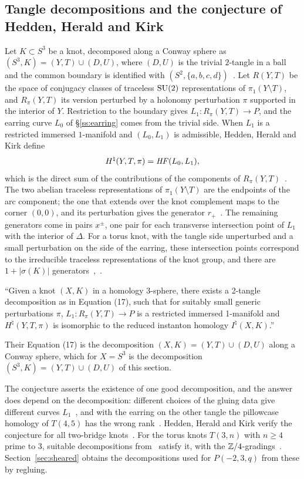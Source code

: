 \subsection{Tangle decompositions and the conjecture of Hedden, Herald and Kirk}\label{ss:decomp}
Let $K\subset S^3$ be a knot, decomposed along a Conway sphere as $(S^3,K)=(Y,T)\cup(D,U)$, where $(D,U)$ is the
trivial $2$-tangle in a ball and the common boundary is identified with
$(S^2,\{a,b,c,d\})$~\cite[(17)]{HHK2}. Let $R(Y,T)$ be the space of conjugacy classes of traceless $\mathrm{SU}(2)$
representations of $\pi_1(Y\setminus T)$, and $R_\pi(Y,T)$ its version perturbed by a holonomy perturbation $\pi$
supported in the interior of $Y$. Restriction to the boundary gives $L_1\colon R_\pi(Y,T)\to P$, and the earring
curve $L_0$ of \S\ref{ss:earring} comes from the trivial side. When $L_1$ is a restricted immersed $1$-manifold and
$(L_0,L_1)$ is admissible, Hedden, Herald and Kirk define
\[
H^{\natural}(Y,T,\pi)=\mathit{HF}(L_0,L_1),
\]
which is the direct sum of the contributions of the components of
$R_\pi(Y,T)$~\cite[p.~34, \S6.1]{HHK2}. The two abelian traceless representations of $\pi_1(Y\setminus T)$ are the
endpoints of the arc component; the one that extends over the knot complement maps to the corner $(0,0)$, and its
perturbation gives the generator $r_+$~\cite[\S6.1, \S8]{HHK2}. The remaining generators come in pairs $x^\pm$, one
pair for each transverse intersection point of $L_1$ with the interior of $\Delta$. For a torus knot, with the
tangle side unperturbed and a small perturbation on the side of the earring, these intersection points correspond
to the irreducible traceless representations of the knot group, and there are $1+|\sigma(K)|$
generators~\cite[Thm.~11.1]{HHK1},~\cite[\S11.10]{HHK2}.

\begin{conjecture}\label{conj:hhk65}
``Given a knot $(X,K)$ in a homology 3-sphere, there exists a 2-tangle decomposition as in Equation (17), such that
for suitably small generic perturbations $\pi$, $L_1:R_\pi(Y,T)\to P$ is a restricted immersed 1-manifold and
$H^\natural(Y,T,\pi)$ is isomorphic to the reduced instanton homology $I^\natural(X,K)$.''
\end{conjecture}

Their Equation (17) is the decomposition $(X,K)=(Y,T)\cup(D,U)$ along a Conway sphere, which for $X=S^3$ is the
decomposition $(S^3,K)=(Y,T)\cup(D,U)$ of this section.

The conjecture asserts the existence of one good decomposition, and the answer does depend on the decomposition:
different choices of the gluing data give different curves $L_1$~\cite[p.~55]{HHK2}, and with the earring on the
other tangle the pillowcase homology of $T(4,5)$ has the wrong rank~\cite[\S10.3]{CHKK}. Hedden, Herald and Kirk
verify the conjecture for all two-bridge knots~\cite[\S7]{HHK2}. For the torus knots $T(3,n)$ with $n\ge4$ prime
to $3$, suitable decompositions from~\cite[\S\S10--11]{HHK2} satisfy it, with the $\mathbb{Z}/4$-gradings~\cite{WuebbenV}. Section~\ref{sec:sheared}
obtains the decompositions used for $P(-2,3,q)$ from these by regluing.


